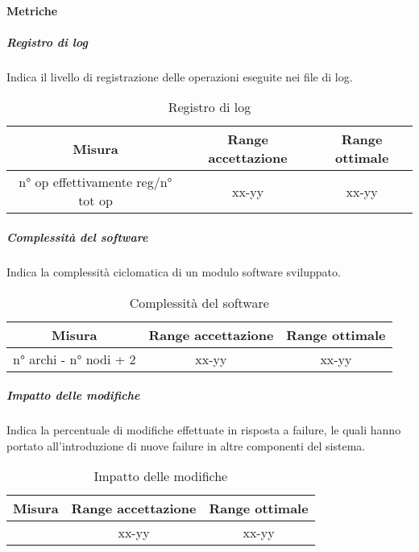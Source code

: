 		\paragraph{Metriche}
			\subparagraph{Registro di log}
			Indica il livello di registrazione delle operazioni eseguite nei file di log.
				\begin{table}[H]
				\begin{center}
					\begin{tabular}{|c|c|c|}
						\hline
						\textbf{Misura} & \textbf{Range accettazione} & \textbf{Range ottimale} \\
						\hline
						n° op effettivamente reg/n° tot op & xx-yy  & xx-yy \\
						\hline
					\end{tabular}
				\end{center}
				\caption{Registro di log}
			\end{table}
	
			\subparagraph{Complessità del software}
			Indica la complessità ciclomatica di un modulo software sviluppato.
				\begin{table}[H]
					\begin{center}
						\begin{tabular}{|c|c|c|}
							\hline
							\textbf{Misura} & \textbf{Range accettazione} & \textbf{Range ottimale} \\
							\hline
							n° archi - n° nodi + 2 & xx-yy  & xx-yy \\
							\hline
						\end{tabular}
					\end{center}
					\caption{Complessità del software}
				\end{table}
			
			\subparagraph{Impatto delle modifiche}
			Indica la percentuale di modifiche effettuate in risposta a failure, le quali hanno portato all’introduzione di nuove failure in altre componenti del sistema.
			\begin{table}[H]
				\begin{center}
					\begin{tabular}{|c|c|c|}
						\hline
						\textbf{Misura} & \textbf{Range accettazione} & \textbf{Range ottimale} \\
						\hline
						 & xx-yy  & xx-yy \\
						\hline
					\end{tabular}
				\end{center}
				\caption{Impatto delle modifiche}
			\end{table}
	
